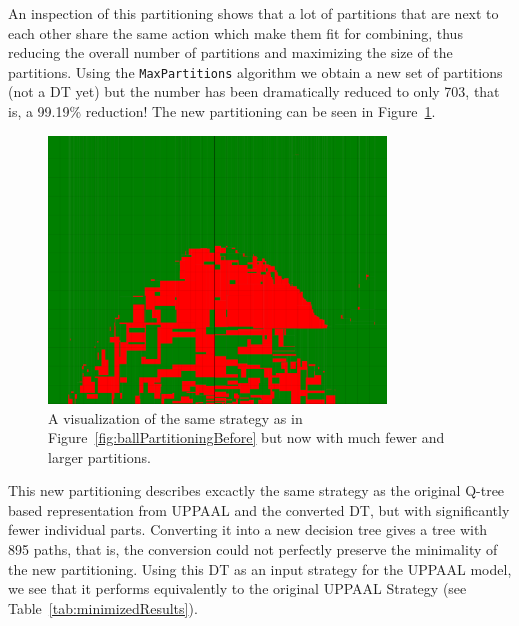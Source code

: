 \documentclass{article}
\begin{document}
An inspection of this partitioning shows that a lot of partitions that are next
to each other share the same action which make them fit for combining, thus
reducing the overall number of partitions and maximizing the size of the
partitions. Using the \texttt{MaxPartitions} algorithm we obtain a new set of
partitions (not a DT yet) but the number has been dramatically reduced to only
703, that is, a 99.19\% reduction! The new partitioning can be seen in
Figure~\ref{fig:ballPartitioningAfter}.

\begin{figure}[h]
    \centering
    \includegraphics[width=0.8\textwidth]{ballPartitioningAfter}
    \caption{%
        A visualization of the same strategy as in
        Figure~\ref{fig:ballPartitioningBefore} but now with much fewer and
        larger partitions.
    }\label{fig:ballPartitioningAfter}
\end{figure}

This new partitioning describes excactly the same strategy as the original
Q-tree based representation from UPPAAL and the converted DT, but with
significantly fewer individual parts. Converting it into a new decision tree
gives a tree with 895 paths, that is, the conversion could not perfectly
preserve the minimality of the new partitioning. Using this DT as an input
strategy for the UPPAAL model, we see that it performs equivalently to the
original UPPAAL Strategy (see Table~\ref{tab:minimizedResults}).
\end{document}
